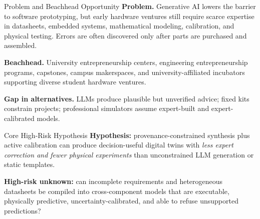 \documentclass[a4paper,landscape]{article}
\begin{document}
\begin{minipage}[t]{0.30\textwidth}
\begin{vmBox}[height=38mm]{Problem and Beachhead Opportunity}
\textbf{Problem.} Generative AI lowers the barrier to software prototyping, but early hardware ventures still require scarce expertise in datasheets, embedded systems, mathematical modeling, calibration, and physical testing. Errors are often discovered only after parts are purchased and assembled.

\textbf{Beachhead.} University entrepreneurship centers, engineering entrepreneurship programs, capstones, campus makerspaces, and university-affiliated incubators supporting diverse student hardware ventures.

\textbf{Gap in alternatives.} LLMs produce plausible but unverified advice; fixed kits constrain projects; professional simulators assume expert-built and expert-calibrated models.
\end{vmBox}

\vspace{1.7mm}
\begin{vmBox}[height=28mm]{Core High-Risk Hypothesis}
\textbf{Hypothesis:} provenance-constrained synthesis plus active calibration can produce decision-useful digital twins with \emph{less expert correction and fewer physical experiments} than unconstrained LLM generation or static templates.

\textbf{High-risk unknown:} can incomplete requirements and heterogeneous datasheets be compiled into cross-component models that are executable, physically predictive, uncertainty-calibrated, and able to refuse unsupported predictions?
\end{vmBox}
\end{minipage}
\hfill
\end{document}
